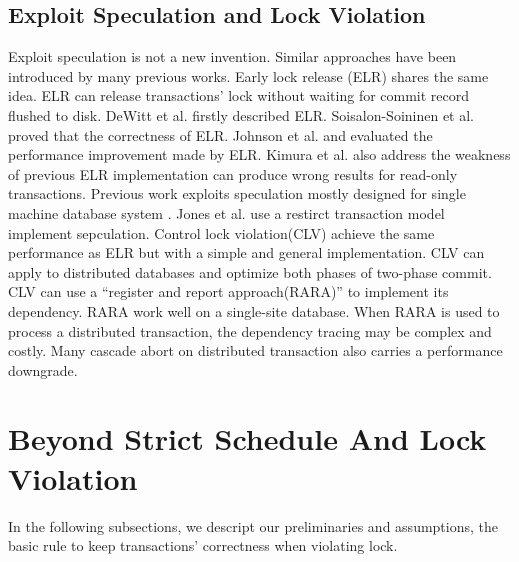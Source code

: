 \documentclass[conference]{IEEEtran}
\begin{document}
\subsection{Exploit Speculation and Lock Violation}
Exploit speculation is not a new invention.
Similar approaches have been introduced by many previous works.
Early lock release (ELR)
\cite{ELR:dewitt_implementation_1984}\cite{PS2PL:conf/icdt/Soisalon-SoininenY95}
\cite{Aether:journals/pvldb/JohnsonPSAA10}
\cite{EfficientLocking:conf/vldb/KimuraGK12}
\cite{Actor-Oriented-DB:conf/icde/Bernstein18}
shares the same idea. 
ELR can release transactions' lock without waiting for commit record flushed to disk.
DeWitt et al.\cite{ELR:dewitt_implementation_1984} firstly described ELR.
Soisalon-Soininen et al.\cite{PS2PL:conf/icdt/Soisalon-SoininenY95} proved that the correctness of ELR.
Johnson et al.\cite{Aether:journals/pvldb/JohnsonPSAA10} and\cite{EfficientLocking:conf/vldb/KimuraGK12} evaluated the performance improvement made by ELR.
Kimura et al.\cite{EfficientLocking:conf/vldb/KimuraGK12}\cite{Aether:journals/pvldb/JohnsonPSAA10} also address the weakness of previous ELR implementation\cite{ELR:dewitt_implementation_1984} can produce wrong results for read-only transactions.
Previous work exploits speculation mostly designed for single machine database system
\cite{PS2PL:conf/icdt/Soisalon-SoininenY95}
\cite{Aether:journals/pvldb/JohnsonPSAA10}
\cite{EfficientLocking:conf/vldb/KimuraGK12}.
Jones et al.\cite{LowOverheadCC:conf/sigmod/JonesAM10} use a restirct transaction model\cite{H-store:journals/pvldb/KallmanKNPRZJMSZHA08} implement sepculation.
Control lock violation(CLV)\cite{CLV:conf/sigmod/GraefeLKTV13} achieve the same performance as ELR but with a simple and general implementation.
CLV can apply to distributed databases and optimize both phases of two-phase commit.
CLV can use a ``register and report approach(RARA)''\cite{HeckatonMVCC:journals/pvldb/LarsonBDFPZ11} to implement its dependency.
RARA work well on a single-site database.
When RARA is used to process a distributed transaction, the dependency tracing may be complex and costly.
Many cascade abort on distributed transaction also carries a performance downgrade.


\section{Beyond Strict Schedule And Lock Violation}
\label{sec:non_strict}

In the following subsections, we descript our preliminaries and assumptions, the basic rule to keep transactions' correctness when violating lock.
\end{document}
